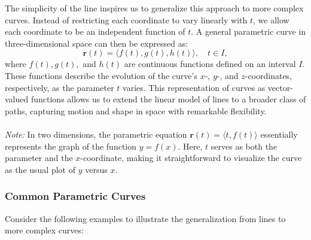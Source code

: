 \noindent The simplicity of the line inspires us to generalize this approach to more complex curves. Instead of restricting each coordinate to vary linearly with \( t \), we allow each coordinate to be an independent function of \( t \). A general parametric curve in three-dimensional space can then be expressed as:
\[
\mathbf{r}(t) = \langle f(t), g(t), h(t) \rangle, \quad t \in I,
\]
where \( f(t), g(t), \) and \( h(t) \) are continuous functions defined on an interval \( I \). These functions describe the evolution of the curve’s \( x \)-, \( y \)-, and \( z \)-coordinates, respectively, as the parameter \( t \) varies. This representation of curves as vector-valued functions allows us to extend the linear model of lines to a broader class of paths, capturing motion and shape in space with remarkable flexibility. \\ \\ 
\textit{Note:} In two dimensions, the parametric equation \( \mathbf{r}(t) = \langle t, f(t) \rangle \) essentially represents the graph of the function \( y = f(x) \). Here, \( t \) serves as both the parameter and the \( x \)-coordinate, making it straightforward to visualize the curve as the usual plot of \( y \) versus \( x \).


\subsubsection*{Common Parametric Curves}

\noindent Consider the following examples to illustrate the generalization from lines to more complex curves:

